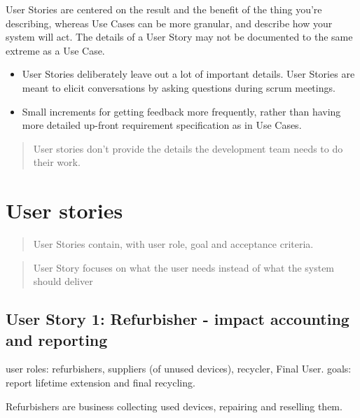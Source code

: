 \documentclass[
]{book}
\begin{document}
User Stories are centered on the result and the benefit of the thing you're describing, whereas Use Cases can be more granular, and describe how your system will act. The details of a User Story may not be documented to the same extreme as a Use Case.

\begin{itemize}
\item
  User Stories deliberately leave out a lot of important details. User Stories are meant to elicit conversations by asking questions during scrum meetings.
\item
  Small increments for getting feedback more frequently, rather than having more detailed up-front requirement specification as in Use Cases.
\end{itemize}

\begin{quote}
User stories don't provide the details the development team needs to do their work.
\end{quote}

\hypertarget{user-stories}{%
\section{User stories}\label{user-stories}}

\begin{quote}
User Stories contain, with user role, goal and acceptance criteria.
\end{quote}

\begin{quote}
User Story focuses on what the user needs instead of what the system should deliver
\end{quote}

\hypertarget{user-story-1-refurbisher---impact-accounting-and-reporting}{%
\subsection{User Story 1: Refurbisher - impact accounting and reporting}\label{user-story-1-refurbisher---impact-accounting-and-reporting}}

user roles: refurbishers, suppliers (of unused devices), recycler, Final User.
goals: report lifetime extension and final recycling.

Refurbishers are business collecting used devices, repairing and reselling them.
\end{document}
